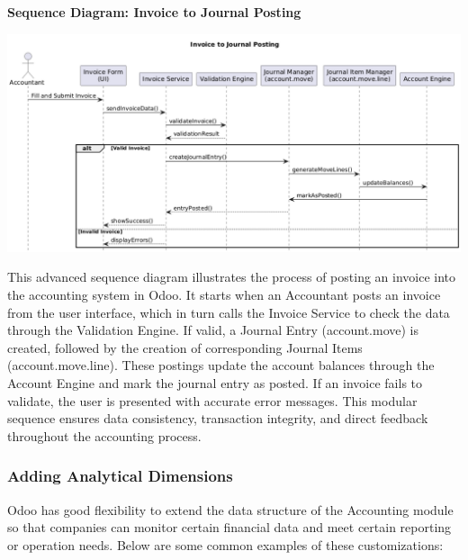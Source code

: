 \documentclass[11pt,a4paper]{article}
\begin{document}
\noindent\textbf{Sequence Diagram: Invoice to Journal Posting}
\begin{center}
    \includegraphics[width=0.8\linewidth]{diagram/Invoice to journal posting.png}
\end{center}
This advanced sequence diagram illustrates the process of posting an invoice into the accounting 
system in Odoo. It starts when an Accountant posts an invoice from the user interface, which in 
turn calls the Invoice Service to check the data through the Validation Engine. If valid, a Journal 
Entry (account.move) is created, followed by the creation of corresponding Journal Items 
(account.move.line). These postings update the account balances through the Account Engine 
and mark the journal entry as posted. If an invoice fails to validate, the user is presented with 
accurate error messages. This modular sequence ensures data consistency, transaction integrity, 
and direct feedback throughout the accounting process.

\subsubsection{Adding Analytical Dimensions}
Odoo has good flexibility to extend the data structure of the Accounting module so that 
companies can monitor certain financial data and meet certain reporting or operation needs. 
Below are some common examples of these customizations:
\end{document}
